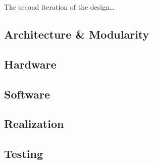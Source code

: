 \IEEEPARstart
{T}{he} second iteration of the design\dots

\subsection{Architecture \& Modularity}


\subsection{Hardware}


\subsection{Software}


\subsection{Realization}


\subsection{Testing}
